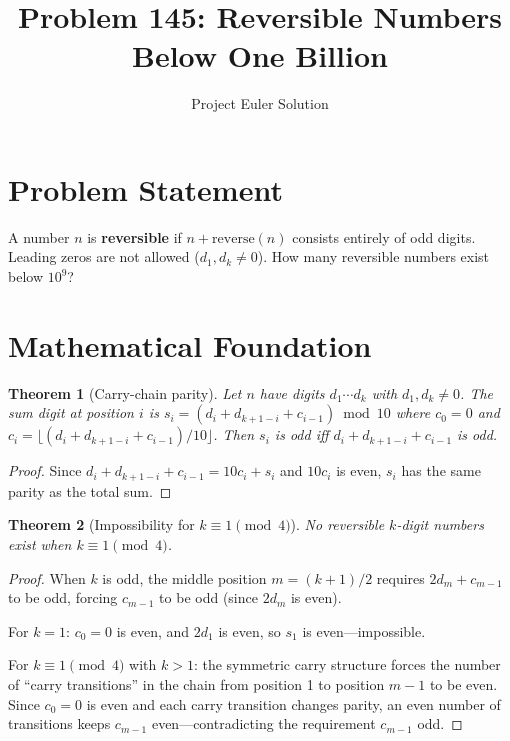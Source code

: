 \documentclass[12pt]{article}
\title{Problem 145: Reversible Numbers Below One Billion}
\author{Project Euler Solution}
\date{}
\newtheorem{theorem}{Theorem}
\begin{document}
\maketitle

\section{Problem Statement}
A number $n$ is \textbf{reversible} if $n + \mathrm{reverse}(n)$ consists entirely of odd digits. Leading zeros are not allowed ($d_1, d_k \neq 0$). How many reversible numbers exist below $10^9$?

\section{Mathematical Foundation}

\begin{theorem}[Carry-chain parity]
Let $n$ have digits $d_1 \cdots d_k$ with $d_1, d_k \neq 0$. The sum digit at position $i$ is $s_i = (d_i + d_{k+1-i} + c_{i-1}) \bmod 10$ where $c_0 = 0$ and $c_i = \lfloor(d_i + d_{k+1-i} + c_{i-1})/10\rfloor$. Then $s_i$ is odd iff $d_i + d_{k+1-i} + c_{i-1}$ is odd.
\end{theorem}

\begin{proof}
Since $d_i + d_{k+1-i} + c_{i-1} = 10c_i + s_i$ and $10c_i$ is even, $s_i$ has the same parity as the total sum.
\end{proof}

\begin{theorem}[Impossibility for $k \equiv 1 \pmod{4}$]
No reversible $k$-digit numbers exist when $k \equiv 1 \pmod{4}$.
\end{theorem}

\begin{proof}
When $k$ is odd, the middle position $m = (k+1)/2$ requires $2d_m + c_{m-1}$ to be odd, forcing $c_{m-1}$ to be odd (since $2d_m$ is even).

For $k = 1$: $c_0 = 0$ is even, and $2d_1$ is even, so $s_1$ is even---impossible.

For $k \equiv 1 \pmod{4}$ with $k > 1$: the symmetric carry structure forces the number of ``carry transitions'' in the chain from position 1 to position $m-1$ to be even. Since $c_0 = 0$ is even and each carry transition changes parity, an even number of transitions keeps $c_{m-1}$ even---contradicting the requirement $c_{m-1}$ odd.
\end{proof}
\end{document}
